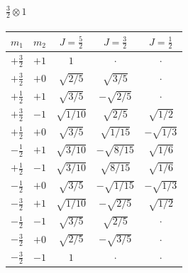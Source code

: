 \documentclass[11pt]{article}
\theoremstyle{plain}
\theoremstyle{definition}
\theoremstyle{remark}
\begin{document}
\paragraph{$\tfrac32 \otimes 1$}
\begin{center}
\begin{tabular}{cc|ccc}
\toprule
$m_1$ & $m_2$ & $J=\tfrac{5}{2}$ & $J=\tfrac{3}{2}$
  & $J=\tfrac{1}{2}$ \\
\midrule
$+\tfrac{3}{2}$ & $+1$ & $1$ & $\cdot$ & $\cdot$ \\
\midrule
$+\tfrac{3}{2}$ & $+0$ & $\sqrt{2/5}$ & $\sqrt{3/5}$ & $\cdot$ \\
$+\tfrac{1}{2}$ & $+1$ & $\sqrt{3/5}$ & $-\sqrt{2/5}$ & $\cdot$ \\
\midrule
$+\tfrac{3}{2}$ & $-1$ & $\sqrt{1/10}$ & $\sqrt{2/5}$
  & $\sqrt{1/2}$ \\
$+\tfrac{1}{2}$ & $+0$ & $\sqrt{3/5}$ & $\sqrt{1/15}$
  & $-\sqrt{1/3}$ \\
$-\tfrac{1}{2}$ & $+1$ & $\sqrt{3/10}$ & $-\sqrt{8/15}$
  & $\sqrt{1/6}$ \\
\midrule
$+\tfrac{1}{2}$ & $-1$ & $\sqrt{3/10}$ & $\sqrt{8/15}$
  & $\sqrt{1/6}$ \\
$-\tfrac{1}{2}$ & $+0$ & $\sqrt{3/5}$ & $-\sqrt{1/15}$
  & $-\sqrt{1/3}$ \\
$-\tfrac{3}{2}$ & $+1$ & $\sqrt{1/10}$ & $-\sqrt{2/5}$
  & $\sqrt{1/2}$ \\
\midrule
$-\tfrac{1}{2}$ & $-1$ & $\sqrt{3/5}$ & $\sqrt{2/5}$ & $\cdot$ \\
$-\tfrac{3}{2}$ & $+0$ & $\sqrt{2/5}$ & $-\sqrt{3/5}$ & $\cdot$ \\
\midrule
$-\tfrac{3}{2}$ & $-1$ & $1$ & $\cdot$ & $\cdot$ \\
\bottomrule
\end{tabular}
\end{center}
\end{document}
